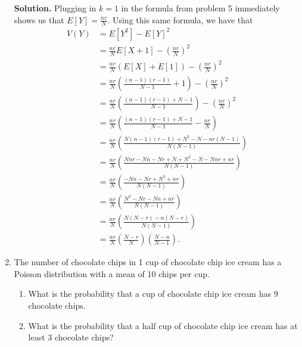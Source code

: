 \documentclass[9pt]{article}
\newcommand{\D}{\displaystyle}
\begin{document}
\begin{enumerate}
         \textbf{Solution.} Plugging in $k = 1$ in the formula from problem 5
         immediately shows us that $\D E[Y] = \frac{nr}{N}$. Using this same
         formula, we have that
         \begin{align*}
            V(Y) &= E[Y^2] - E[Y]^2 \\
                 &= \frac{nr}{N}E[X+1] - \left(\frac{nr}{N}\right)^2 \\
                 &= \frac{nr}{N}(E[X]+E[1]) - \left(\frac{nr}{N}\right)^2 \\
                 &= \frac{nr}{N}\left(\frac{(n-1)(r-1)}{N-1}+1\right) -
                    \left(\frac{nr}{N}\right)^2 \\
                 &= \frac{nr}{N}\left(\frac{(n-1)(r-1)+N-1}{N-1}\right) -
                    \left(\frac{nr}{N}\right)^2 \\
                 &= \frac{nr}{N}\left(\frac{(n-1)(r-1)+N-1}{N-1}-
                    \frac{nr}{N}\right) \\
                 &= \frac{nr}{N}\left(
                    \frac{N(n-1)(r-1)+N^2-N-nr(N-1)}{N(N-1)}\right) \\
                 &= \frac{nr}{N}\left(
                    \frac{Nnr-Nn-Nr+N+N^2-N-Nnr+nr}{N(N-1)}\right) \\
                 &= \frac{nr}{N}\left(\frac{-Nn-Nr+N^2+nr}{N(N-1)}\right) \\
                 &= \frac{nr}{N}\left(\frac{N^2-Nr-Nn+nr}{N(N-1)}\right) \\
                 &= \frac{nr}{N}\left(\frac{N(N-r)-n(N-r)}{N(N-1)}\right) \\
                 &= \frac{nr}{N}\left(\frac{N-r}{N}\right)
                    \left(\frac{N-n}{N-1}\right).
         \end{align*}
   \item The number of chocolate chips in 1 cup of chocolate chip ice cream has
         a Poisson distribution with a mean of 10 chips per cup.
         \begin{enumerate}
            \item What is the probability that a cup of chocolate chip ice
                  cream has 9 chocolate chips.
            \item What is the probability that a half cup of chocolate chip ice
                  cream has at least 3 chocolate chips?
         \end{enumerate}


\end{enumerate}
\end{document}
